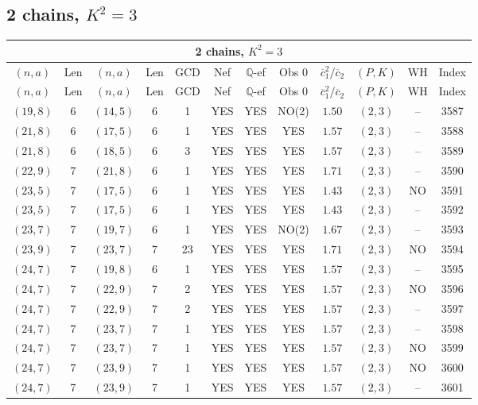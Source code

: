 \subsection{2 chains, $K^2 = 3$}
\begin{longtable}{|c|c|c|c|c|c|c|c|c|c|c|c|}
\hline
\multicolumn{12}{|c|}{2 chains, $K^2 = 3$}\\
\hline
$(n,a)$ & Len & $(n,a)$ & Len & GCD & Nef & $\mathbb Q$-ef & Obs 0 & $\overline c_1^2 / \overline c_2$ & $(P,K)$ & WH & Index\\
\hline
\endfirsthead

\hline
$(n,a)$ & Len & $(n,a)$ & Len & GCD & Nef & $\mathbb Q$-ef & Obs 0 & $\overline c_1^2 / \overline c_2$ & $(P,K)$ & WH & Index\\
\hline
\endhead
\hline
\endfoot

$(19,8)$ & 6 & $(14,5)$ & 6 & 1 & YES & YES & NO(2) & $1.50$ & $(2,3)$ & -- & 3587\\
$(21,8)$ & 6 & $(17,5)$ & 6 & 1 & YES & YES & YES & $1.57$ & $(2,3)$ & -- & 3588\\
$(21,8)$ & 6 & $(18,5)$ & 6 & 3 & YES & YES & YES & $1.57$ & $(2,3)$ & -- & 3589\\
$(22,9)$ & 7 & $(21,8)$ & 6 & 1 & YES & YES & YES & $1.71$ & $(2,3)$ & -- & 3590\\
$(23,5)$ & 7 & $(17,5)$ & 6 & 1 & YES & YES & YES & $1.43$ & $(2,3)$ & NO & 3591\\
$(23,5)$ & 7 & $(17,5)$ & 6 & 1 & YES & YES & YES & $1.43$ & $(2,3)$ & -- & 3592\\
$(23,7)$ & 7 & $(19,7)$ & 6 & 1 & YES & YES & NO(2) & $1.67$ & $(2,3)$ & -- & 3593\\
$(23,9)$ & 7 & $(23,7)$ & 7 & 23 & YES & YES & YES & $1.71$ & $(2,3)$ & NO & 3594\\
$(24,7)$ & 7 & $(19,8)$ & 6 & 1 & YES & YES & YES & $1.57$ & $(2,3)$ & -- & 3595\\
$(24,7)$ & 7 & $(22,9)$ & 7 & 2 & YES & YES & YES & $1.57$ & $(2,3)$ & NO & 3596\\
$(24,7)$ & 7 & $(22,9)$ & 7 & 2 & YES & YES & YES & $1.57$ & $(2,3)$ & -- & 3597\\
$(24,7)$ & 7 & $(23,7)$ & 7 & 1 & YES & YES & YES & $1.57$ & $(2,3)$ & -- & 3598\\
$(24,7)$ & 7 & $(23,7)$ & 7 & 1 & YES & YES & YES & $1.57$ & $(2,3)$ & NO & 3599\\
$(24,7)$ & 7 & $(23,9)$ & 7 & 1 & YES & YES & YES & $1.57$ & $(2,3)$ & NO & 3600\\
$(24,7)$ & 7 & $(23,9)$ & 7 & 1 & YES & YES & YES & $1.57$ & $(2,3)$ & -- & 3601\\

\end{longtable}
